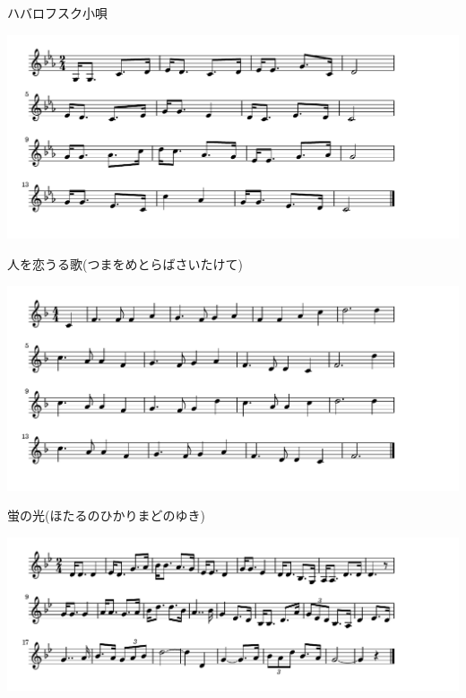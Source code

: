 \documentclass[a4paper]{ltjsarticle}
\begin{document}
\vspace{-10mm} \hspace{10mm}
ハバロフスク小唄

\includegraphics[clip]{hitowokouruuta_crop.pdf}

\vspace{-10mm} \hspace{10mm}
人を恋うる歌(つまをめとらばさいたけて)

\includegraphics[clip]{hotarunohikari_crop.pdf}

\vspace{-10mm} \hspace{10mm}
蛍の光(ほたるのひかりまどのゆき)

\includegraphics[clip]{mugitoheitai_crop.pdf}
\end{document}
